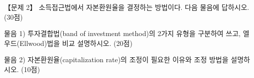 \begin{longquestion}{【문제 2】}
소득접근법에서 자본환원율을 결정하는 방법이다. 다음 물음에 답하시오. (30점) \par
\medskip\noindent 물음 1) 투자결합법(band of investment method)의 2가지 유형을 구분하여 쓰고, 엘우드(Ellwood)법을 비교 설명하시오. (20점) \par
\medskip\noindent 물음 2) 자본환원율(capitalization rate)의 조정이 필요한 이유와 조정 방법을 설명하시오. (10점) \par
\end{longquestion}
